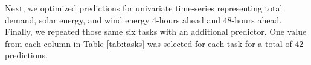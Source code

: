 Next, we optimized predictions for
univariate time-series
representing total demand, solar energy, and wind energy 4-hours ahead and
48-hours ahead. Finally, we repeated those same six tasks with an additional
predictor. One value from each column in Table \ref{tab:tasks} was selected for
each task for a total of 42 predictions.

\begin{table}[ht]
  \centering
  \caption{Summary of prediction tasks.}
  \label{tab:tasks}
\end{table}
